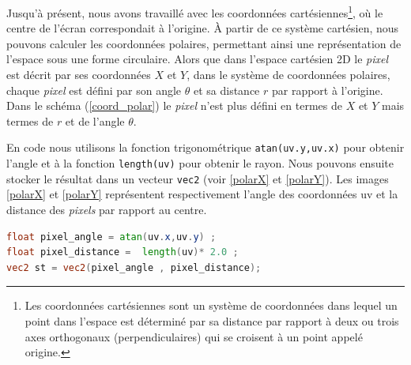 Jusqu'à présent, nous avons travaillé avec les coordonnées cartésiennes\footnote{Les coordonnées cartésiennes sont un système de coordonnées dans lequel un point dans l'espace est déterminé par sa distance par rapport à deux ou trois axes orthogonaux (perpendiculaires) qui se croisent à un point appelé origine.}, où le centre de l'écran correspondait à l'origine. À partir de ce système cartésien, nous pouvons calculer les coordonnées polaires, permettant ainsi une représentation de l'espace sous une forme circulaire. Alors que dans l'espace cartésien 2D le \textit{pixel} est décrit par ses coordonnées $X$ et $Y$, dans le système de coordonnées polaires, chaque \textit{pixel} est défini par son angle $\theta$ et sa distance $r$ par rapport à l'origine. Dans le schéma (\ref{coord_polar}) le \textit{pixel} n'est plus défini en termes de $X$ et $Y$ mais termes de $r$ et de l'angle $\theta$.

En code nous utilisons la fonction trigonométrique \lstinline{atan(uv.y,uv.x)} pour obtenir l'angle et à la fonction \lstinline{length(uv)} pour obtenir le rayon. Nous pouvons ensuite stocker le résultat dans un vecteur \lstinline{vec2} (voir \ref{polarX} et \ref{polarY}). Les images \ref{polarX} et \ref{polarY} représentent respectivement l'angle des coordonnées uv et la distance des \textit{pixels} par rapport au centre.


\begin{minipage}{\linewidth}
\begin{lstlisting}[language=GLSL, caption=Calculer les coordonnées polaires,captionpos=b,frame=single]
float pixel_angle = atan(uv.x,uv.y) ;
float pixel_distance =  length(uv)* 2.0 ;
vec2 st = vec2(pixel_angle , pixel_distance);
\end{lstlisting}
\end{minipage}



